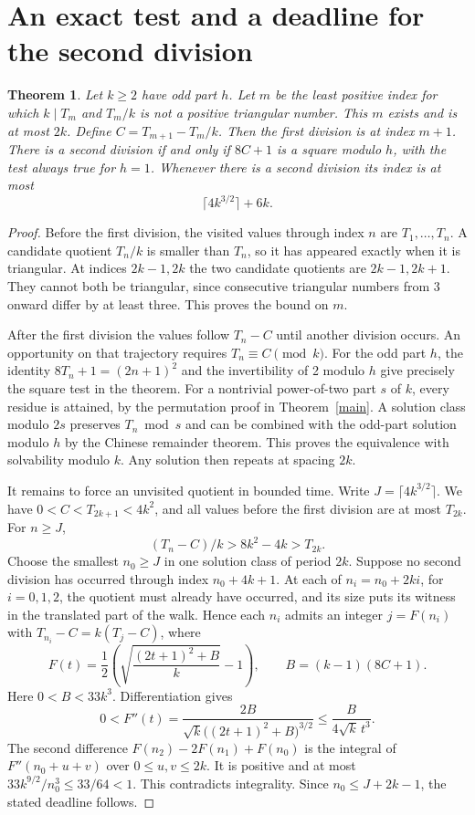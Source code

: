 \documentclass[10pt]{article}
\newtheorem{theorem}{Theorem}
\begin{document}
\section{An exact test and a deadline for the second division}
\begin{theorem}\label{second}
Let $k\ge2$ have odd part $h$. Let $m$ be the least positive index for which $k\mid T_m$ and $T_m/k$ is not a positive triangular number. This $m$ exists and is at most $2k$. Define $C=T_{m+1}-T_m/k$. Then the first division is at index $m+1$. There is a second division if and only if $8C+1$ is a square modulo $h$, with the test always true for $h=1$. Whenever there is a second division its index is at most
\[
 \lceil 4k^{3/2}\rceil+6k.
\]
\end{theorem}
\begin{proof}
Before the first division, the visited values through index $n$ are $T_1,\ldots,T_n$. A candidate quotient $T_n/k$ is smaller than $T_n$, so it has appeared exactly when it is triangular. At indices $2k-1,2k$ the two candidate quotients are $2k-1,2k+1$. They cannot both be triangular, since consecutive triangular numbers from $3$ onward differ by at least three. This proves the bound on $m$.

After the first division the values follow $T_n-C$ until another division occurs. An opportunity on that trajectory requires $T_n\equiv C\pmod k$. For the odd part $h$, the identity $8T_n+1=(2n+1)^2$ and the invertibility of 2 modulo $h$ give precisely the square test in the theorem. For a nontrivial power-of-two part $s$ of $k$, every residue is attained, by the permutation proof in Theorem~\ref{main}. A solution class modulo $2s$ preserves $T_n\bmod s$ and can be combined with the odd-part solution modulo $h$ by the Chinese remainder theorem. This proves the equivalence with solvability modulo $k$. Any solution then repeats at spacing $2k$.

It remains to force an unvisited quotient in bounded time. Write $J=\lceil4k^{3/2}\rceil$. We have $0<C<T_{2k+1}<4k^2$, and all values before the first division are at most $T_{2k}$. For $n\ge J$,
\[
 (T_n-C)/k>8k^2-4k>T_{2k}.
\]
Choose the smallest $n_0\ge J$ in one solution class of period $2k$. Suppose no second division has occurred through index $n_0+4k+1$. At each of $n_i=n_0+2ki$, for $i=0,1,2$, the quotient must already have occurred, and its size puts its witness in the translated part of the walk. Hence each $n_i$ admits an integer $j=F(n_i)$ with $T_{n_i}-C=k(T_j-C)$, where
\[
 F(t)=\frac{1}{2}\left(\sqrt{\frac{(2t+1)^2+B}{k}}-1\right),\qquad B=(k-1)(8C+1).
\]
Here $0<B<33k^3$. Differentiation gives
\[
 0<F''(t)=\frac{2B}{\sqrt{k}\big((2t+1)^2+B\big)^{3/2}}
 \le \frac{B}{4\sqrt{k}\,t^3}.
\]
The second difference $F(n_2)-2F(n_1)+F(n_0)$ is the integral of $F''(n_0+u+v)$ over $0\le u,v\le2k$. It is positive and at most $33k^{9/2}/n_0^3\le33/64<1$. This contradicts integrality. Since $n_0\le J+2k-1$, the stated deadline follows.
\end{proof}
\end{document}
